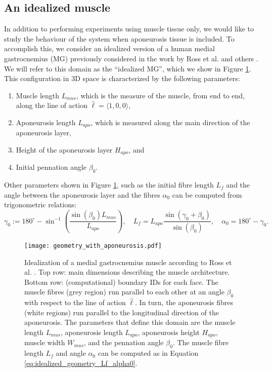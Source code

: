 \documentclass{sfuthesis}
\numberwithin{equation}{section}
\numberwithin{figure}{chapter}
\numberwithin{table}{chapter}
\theoremstyle{definition}
\begin{document}
\subsection{An idealized muscle}

In addition to performing experiments using muscle tissue only, we would like to study the behaviour of the system when aponeurosis tissue is included. To accomplish this, we consider an idealized version of a human medial gastrocnemius (MG) previously considered in the work by Ross et al. \cite{Paper3_RossEtAl2021} and others \cite{Seba,Hadi}. We will refer to this domain as the ``idealized MG'', which we show in Figure \ref{fig:idealized_geometry}. This configuration in 3D space is characterized by the following parameters:
\begin{enumerate}
    \item Muscle length $L_{mus}$, which is the measure of the muscle, from end to end, along the line of action $\widehat{\bm{\ell}} = \langle 1,0,0 \rangle$,
    \item Aponeurosis length $L_{apo}$, which is measured along the main direction of the aponeurosis layer,
    \item Height of the aponeurosis layer $H_{apo}$, and
    \item Initial pennation angle $\beta_0$.
\end{enumerate}

Other parameters shown in Figure \ref{fig:idealized_geometry}, such as the initial fibre length $L_f$ and the angle between the aponeurosis layer and the fibres $\alpha_0$ can be computed from trigonometric relations:
\begin{equation} \label{eq:idealized_geometry_Lf_alpha0}
    \gamma_0 := 180^\circ - \sin^{-1} \left(\dfrac{\sin(\beta_0) L_{mus}}{L_{apo}} \right), \quad
    L_f = L_{apo} \dfrac{\sin(\gamma_0 + \beta_0)}{\sin(\beta_0)}, \quad
    \alpha_0 = 180^\circ - \gamma_0.
\end{equation}

\begin{figure}
    \centering
    \texttt{[image: geometry\_with\_aponeurosis.pdf]}
    \caption{Idealization of a medial gastrocnemius muscle according to Ross et al. \cite{Paper3_RossEtAl2021}. Top row: main dimensions describing the muscle architecture. Bottom row: (computational) boundary IDs for each face. The muscle fibres (grey region) run parallel to each other at an angle $\beta_0$ with respect to the line of action $\widehat{\bm{\ell}}$. In turn, the aponeurosis fibres (white regions) run parallel to the longitudinal direction of the aponeurosis. The parameters that define this domain are the muscle length $L_{mus}$, aponeurosis length $L_{apo}$, aponeurosis height $H_{apo}$, muscle width $W_{mus}$, and the pennation angle $\beta_0$. The muscle fibre length $L_f$ and angle $\alpha_0$ can be computed as in Equation \eqref{eq:idealized_geometry_Lf_alpha0}. 
    \label{fig:idealized_geometry}}
\end{figure}
\end{document}
